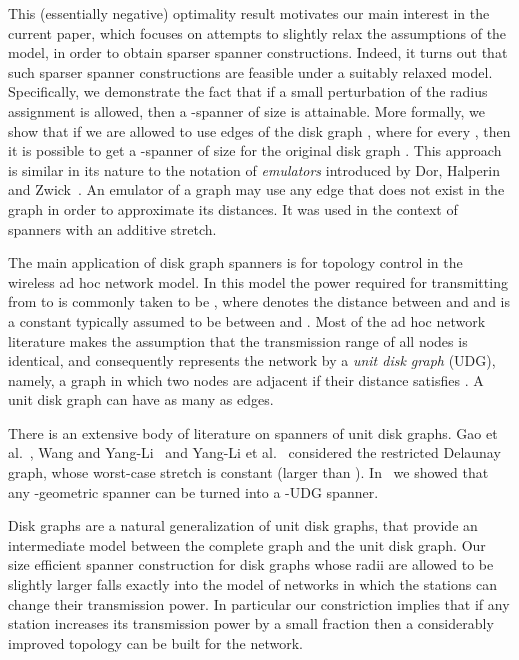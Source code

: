 \documentclass[proceedings]{stacs}
\theoremstyle{plain}\newtheorem{satz}[thm]{Satz}
\theoremstyle{definition}\newtheorem{crucial}[thm]{Crucial Definition}
\begin{document}
This (essentially negative) optimality result motivates our main
interest in the current paper, which focuses on attempts to
slightly relax the assumptions of the model, in order to obtain
sparser spanner constructions. Indeed, it turns out that such
sparser spanner constructions are feasible under a suitably
relaxed model. Specifically, we demonstrate the fact that if a
small perturbation of the radius assignment is allowed, then a
-spanner of size  is attainable. More
formally, we show that if we are allowed to use edges of the disk
graph , where  for every , then it is possible to get a
-spanner of size  for the original disk
graph . This approach is similar in its nature to the
notation of \textit{emulators} introduced by Dor, Halperin and
Zwick~\cite{DoHaZw00}. An emulator of a graph may use any edge
that does not exist in the graph in order to approximate its
distances. It was used in the context of spanners with an additive
stretch.

The main application of disk graph spanners is for topology
control in the wireless ad hoc network model. In this model the
power required for transmitting from  to  is commonly taken
to be , where  denotes the
distance between  and  and  is a constant typically
assumed to be between  and . Most of the ad hoc network
literature makes the assumption that the transmission range of all
nodes is identical, and consequently represents the network by a
\emph{unit disk graph} (UDG), namely, a graph in which two nodes
 are adjacent if their distance satisfies . A unit disk graph can have as many as  edges.

There is an extensive body of literature on spanners of unit disk
graphs. Gao et al.~\cite{gao05geometric}, Wang and
Yang-Li~\cite{WaLi06a} and Yang-Li et al.~\cite{Yang2003}
considered the restricted Delaunay graph, whose worst-case stretch
is constant (larger than ). In~\cite{PeRo08} we showed
that any -geometric spanner can be turned into a
-UDG spanner.

Disk graphs are a natural generalization of unit disk graphs, that
provide an intermediate model between the complete graph and the
unit disk graph. Our size efficient spanner construction for disk
graphs whose radii are allowed to be slightly larger falls exactly
into the model of networks in which the stations can change their
transmission power. In particular our constriction implies that if
any station increases its transmission power by a small fraction
then a considerably improved topology can be built for the
network.
\end{document}
